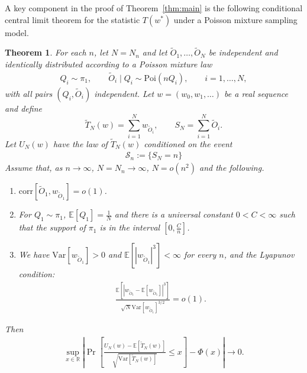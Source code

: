 \documentclass[11pt]{article}
\newtheorem{thm}{Theorem}[section]
\numberwithin{equation}{section}
\newcommand{\Pois}{\mathrm{Poi}}
\newcommand{\Scal}{\mathcal{S}}
\newcommand{\Prp}[1]{\Pr\left[#1 \right]}
\newcommand{\reals}{\mathbb R}
\newcommand{\Var}[1]{\mathrm{Var}\left[ #1\right]}
\newcommand{\ex}[1]{\ensuremath{\mathbb{E}\left[ #1\right]}}
\newcommand{\Corr}[1]{\mathrm{corr} \left[#1\right]}
\begin{document}
A key component in the proof of Theorem~\ref{thm:main} is the following conditional central limit theorem for the statistic $T(w^*)$ under a Poisson mixture sampling model.
\begin{thm}
    \label{thm:CLT}
        For each $n$, let $N=N_n$ and let
        $\tilde O_1,\ldots,\tilde O_N$ be independent and identically distributed according to a Poisson mixture law
        \begin{align}
            \label{eq:Poisson_mixture_model}
        Q_i\sim \pi_1,\qquad
        \tilde O_i\mid Q_i\sim \Pois(nQ_i),
        \qquad i=1,\ldots,N,
        \end{align}
        with all pairs $(Q_i, \tilde O_i)$ independent. Let $w =(w_0,w_1,\ldots)$ be a real sequence and define
        \[
        \tilde T_N(w)=\sum_{i=1}^N w_{\tilde O_i},
        \qquad
        S_N=\sum_{i=1}^N \tilde{O}_i.
        \]
        Let $U_N(w)$ have the law of $\tilde T_N(w)$ conditioned on the event
        \begin{align}
        \label{eq:Scal_def}
        \Scal_n := \{S_N=n\}    
        \end{align}
        Assume that, as $n\to\infty$, $N = N_n \to \infty$, $N=o(n^2)$ and the following. 
        \begin{enumerate}    
        \item[(i)] $\Corr{\tilde O_1,w_{\tilde O_1}}=o(1)$.
        
        \item[(ii)] For $Q_1 \sim \pi_1$, $\ex{Q_1}=\frac{1}{N}$ and 
        there is a universal constant $0<C<\infty$ such that the support of $\pi_1$ is in the interval $\left[0,\frac{C}{n}\right]$.
        
        \item[(iii)] We have $\Var{w_{\tilde{O}_1}}>0$ and
        $\ex{|w_{\tilde{O}_1}|^3}<\infty$ for every $n$, and the Lyapunov condition:
        \begin{align*}
        \frac{\ex{\left|w_{\tilde O_1}
        -\ex{w_{\tilde O_1}}\right|^3}}
        {{\sqrt N}\Var{w_{\tilde O_1}}^{3/2}} = o(1).
        \end{align*}
        \end{enumerate}
        Then
        \begin{align*}
        \sup_{x\in\reals} \left| \Prp{ \frac{U_N(w)-\ex{\tilde T_N(w)}}
        {\sqrt{\Var{\tilde T_N(w)}}} \le x } - \Phi(x) \right| \longrightarrow 0.
        \end{align*}
\end{thm}
\end{document}

